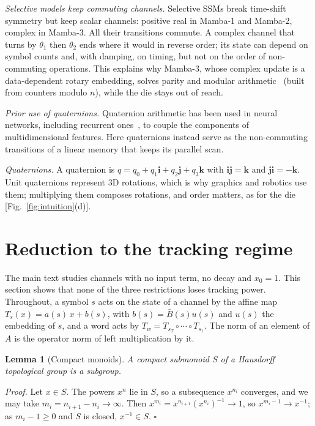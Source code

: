 \documentclass[aps,prx,reprint,superscriptaddress,longbibliography,nofootinbib,floatfix]{revtex4-2}
\theoremstyle{plain}
\newtheorem{lemma}{Lemma}
\theoremstyle{definition}
\begin{document}
\emph{Selective models keep commuting channels.} Selective SSMs break
time-shift symmetry but keep scalar channels: positive real in Mamba-1 and
Mamba-2, complex in Mamba-3. All their transitions commute. A complex channel
that turns by $\theta_1$ then $\theta_2$ ends where it would in reverse
order; its state can depend on symbol counts and, with damping, on timing,
but not on the order of non-commuting operations. This explains why
Mamba-3, whose complex update is a data-dependent rotary embedding, solves
parity and modular arithmetic~\cite{mamba3} (built from counters modulo
$n$), while the die stays out of reach.

\emph{Prior use of quaternions.} Quaternion arithmetic has been used in
neural networks, including recurrent ones~\cite{parcollet_qrnn}, to couple
the components of multidimensional features. Here quaternions instead serve
as the non-commuting transitions of a linear memory that keeps its parallel
scan.

\emph{Quaternions.} A quaternion is $q=q_0+q_1\mathbf i+q_2\mathbf
j+q_3\mathbf k$ with $\mathbf{ij}=\mathbf k$ and $\mathbf{ji}=-\mathbf k$.
Unit quaternions represent 3D rotations, which is why graphics and robotics
use them; multiplying them composes rotations, and order matters, as for the
die [Fig.~\ref{fig:intuition}(d)].

\section{Reduction to the tracking regime}\label{sm:regime}

The main text studies channels with no input term, no decay and $x_0=1$.
This section shows that none of the three restrictions loses tracking power.
Throughout, a symbol $s$ acts on the state of a channel by the affine map
$T_s(x)=a(s)\,x+b(s)$, with $b(s)=\bar B(s)u(s)$ and $u(s)$ the embedding of
$s$, and a word acts by $T_w=T_{s_T}\circ\cdots\circ T_{s_1}$. The norm of an
element of $A$ is the operator norm of left multiplication by it.

\begin{lemma}[Compact monoids]\label{lem:monoid}
A compact submonoid $S$ of a Hausdorff topological group is a subgroup.
\end{lemma}
\emph{Proof.} Let $x\in S$. The powers $x^n$ lie in $S$, so a subsequence
$x^{n_i}$ converges, and we may take $m_i=n_{i+1}-n_i\to\infty$. Then
$x^{m_i}=x^{n_{i+1}}(x^{n_i})^{-1}\to1$, so $x^{m_i-1}\to x^{-1}$; as
$m_i-1\ge0$ and $S$ is closed, $x^{-1}\in S$. $\square$
\end{document}
